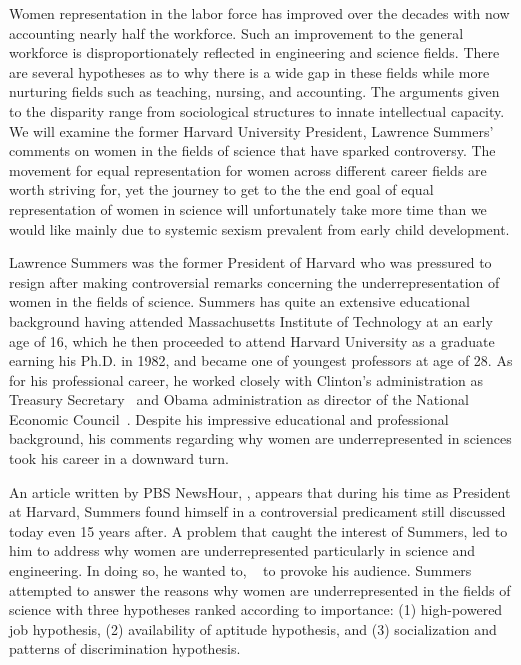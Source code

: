 
\par
Women representation in the labor force has improved over the decades with now accounting nearly 
half the workforce. Such an improvement to the general workforce is disproportionately reflected 
in engineering and science fields. There are several hypotheses as to why there is a wide gap in 
these fields while more nurturing fields such as teaching, nursing, and accounting. The arguments 
given to the disparity range from sociological structures to innate intellectual capacity. We will 
examine the former Harvard University President, Lawrence Summers’ comments on women in the fields 
of science that have sparked controversy. The movement for 	equal representation for women across 
different career fields are worth striving for, yet the journey to get to the the end goal of equal 
representation of women in science will unfortunately take more time than we would like mainly due 
to systemic sexism prevalent from early child development. 

\par
Lawrence Summers was the former President of Harvard who was pressured to resign after making 
controversial remarks concerning the underrepresentation of women in the fields of science. 
Summers has quite an extensive educational background having attended Massachusetts Institute 
of Technology at an early age of 16, which he then proceeded to attend Harvard University as 
a graduate earning his Ph.D. in 1982, and became one of youngest professors at age of 28. 
As for his professional career, he worked closely with Clinton’s administration as Treasury 
Secretary~\cite{ustreasury} and Obama administration as director of the National Economic 
Council~\cite{economicconcil}. Despite his impressive educational and professional background, 
his comments regarding why women are underrepresented in sciences took his career in a downward turn.	

\par
An article written by PBS NewsHour, ,\cite{summers} appears that during his time as President at Harvard, Summers found 
himself in a controversial predicament still discussed today even 15 years after. A problem that 
caught the interest of Summers, led to him to address why women are underrepresented particularly 
in science and engineering. In doing so, he wanted to, ~\cite{summers} to provoke his audience. Summers 
attempted to answer the reasons why women are underrepresented in the fields of science with three 
hypotheses ranked according to importance: (1) high-powered job hypothesis, (2) availability of 
aptitude hypothesis, and (3) socialization and patterns of discrimination hypothesis.


